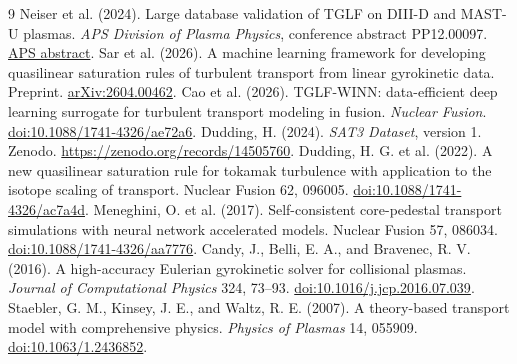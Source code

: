 \documentclass[10pt,letterpaper]{article}
\begin{document}
      {\small
            \begin{thebibliography}{9}
                  \setlength{\itemsep}{2pt}
                  \setlength{\parskip}{0pt}
                  Neiser et al. (2024). Large database validation of TGLF on DIII-D and
                  MAST-U plasmas. \textit{APS Division of Plasma Physics}, conference abstract
                  PP12.00097. \href{https://meetings-archive.aps.org/dpp/2024/pp12/97/}{APS abstract}.
                  Sar et al. (2026). A machine learning framework for developing quasilinear
                  saturation rules of turbulent transport from linear gyrokinetic data.
                  Preprint. \href{https://arxiv.org/abs/2604.00462}{arXiv:2604.00462}.
                  Cao et al. (2026). TGLF-WINN: data-efficient deep learning surrogate for
                  turbulent transport modeling in fusion. \textit{Nuclear Fusion}.
                  \href{https://doi.org/10.1088/1741-4326/ae72a6}{doi:10.1088/1741-4326/ae72a6}.
                  Dudding, H. (2024). \textit{SAT3 Dataset}, version 1. Zenodo.
                  \url{https://zenodo.org/records/14505760}.
                  Dudding, H. G. et al. (2022). A new quasilinear saturation rule for tokamak
                  turbulence with application to the isotope scaling of transport.
                  Nuclear Fusion 62, 096005.
                  \href{https://doi.org/10.1088/1741-4326/ac7a4d}{doi:10.1088/1741-4326/ac7a4d}.
                  Meneghini, O. et al. (2017). Self-consistent core-pedestal transport
                  simulations with neural network accelerated models.
                  Nuclear Fusion 57, 086034.
                  \href{https://doi.org/10.1088/1741-4326/aa7776}{doi:10.1088/1741-4326/aa7776}.
                  Candy, J., Belli, E. A., and Bravenec, R. V. (2016). A high-accuracy
                  Eulerian gyrokinetic solver for collisional plasmas.
                  \textit{Journal of Computational Physics} 324, 73--93.
                  \href{https://doi.org/10.1016/j.jcp.2016.07.039}{doi:10.1016/j.jcp.2016.07.039}.
                  Staebler, G. M., Kinsey, J. E., and Waltz, R. E. (2007). A theory-based
                  transport model with comprehensive physics.
                  \textit{Physics of Plasmas} 14, 055909.
                  \href{https://doi.org/10.1063/1.2436852}{doi:10.1063/1.2436852}.
            \end{thebibliography}
      }
\end{document}
